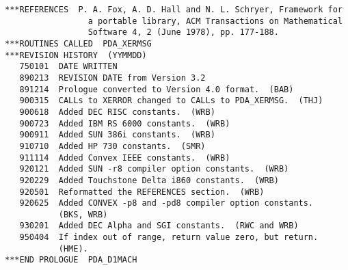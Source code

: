 \begin{verbatim}
***REFERENCES  P. A. Fox, A. D. Hall and N. L. Schryer, Framework for
                 a portable library, ACM Transactions on Mathematical
                 Software 4, 2 (June 1978), pp. 177-188.
***ROUTINES CALLED  PDA_XERMSG
***REVISION HISTORY  (YYMMDD)
   750101  DATE WRITTEN
   890213  REVISION DATE from Version 3.2
   891214  Prologue converted to Version 4.0 format.  (BAB)
   900315  CALLs to XERROR changed to CALLs to PDA_XERMSG.  (THJ)
   900618  Added DEC RISC constants.  (WRB)
   900723  Added IBM RS 6000 constants.  (WRB)
   900911  Added SUN 386i constants.  (WRB)
   910710  Added HP 730 constants.  (SMR)
   911114  Added Convex IEEE constants.  (WRB)
   920121  Added SUN -r8 compiler option constants.  (WRB)
   920229  Added Touchstone Delta i860 constants.  (WRB)
   920501  Reformatted the REFERENCES section.  (WRB)
   920625  Added CONVEX -p8 and -pd8 compiler option constants.
           (BKS, WRB)
   930201  Added DEC Alpha and SGI constants.  (RWC and WRB)
   950404  If index out of range, return value zero, but return.
           (HME).
***END PROLOGUE  PDA_D1MACH
\end{verbatim}


